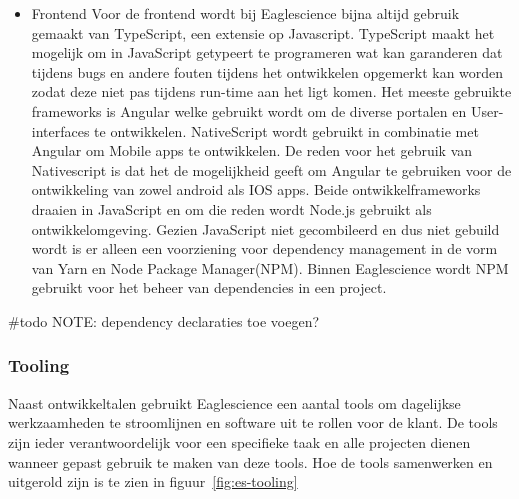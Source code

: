 \begin{itemize}
    \item {Frontend}
    Voor de frontend wordt bij Eaglescience bijna altijd gebruik gemaakt van TypeScript, een extensie op Javascript. TypeScript maakt het mogelijk om in JavaScript getypeert te programeren wat kan garanderen dat tijdens bugs en andere fouten tijdens het ontwikkelen opgemerkt kan worden zodat deze niet pas tijdens run-time aan het ligt komen. Het meeste gebruikte frameworks is Angular welke gebruikt wordt om de diverse portalen en User-interfaces te ontwikkelen. NativeScript wordt gebruikt in combinatie met Angular om Mobile apps te ontwikkelen. De reden voor het gebruik van Nativescript is dat het de mogelijkheid geeft om Angular te gebruiken voor de ontwikkeling van zowel android als IOS apps. Beide ontwikkelframeworks draaien in JavaScript en om die reden wordt Node.js gebruikt als ontwikkelomgeving. Gezien JavaScript niet gecombileerd en dus niet gebuild wordt is er alleen een voorziening voor dependency management in de vorm van Yarn en Node Package Manager(NPM). Binnen Eaglescience wordt NPM gebruikt voor het beheer van dependencies in een project.
\end{itemize}

#todo NOTE: dependency declaraties toe voegen?

\subsubsection{Tooling}\label{subsubsec:tooling}
Naast ontwikkeltalen gebruikt Eaglescience een aantal tools om dagelijkse werkzaamheden te stroomlijnen en software uit te rollen voor de klant. De tools zijn ieder verantwoordelijk voor een specifieke taak en alle projecten dienen wanneer gepast gebruik te maken van deze tools. Hoe de tools samenwerken en uitgerold zijn is te zien in figuur~\ref{fig:es-tooling}

